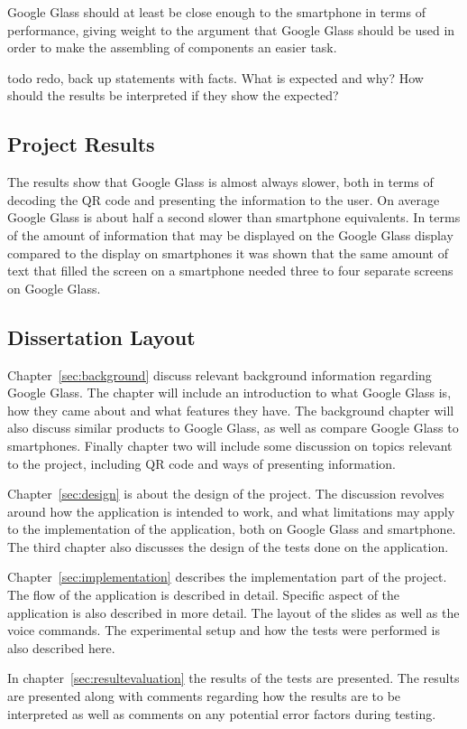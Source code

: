 Google Glass should at least be close enough to the smartphone in terms of performance, giving weight to the argument that Google Glass should be used in order to make the assembling of components an easier task.

todo redo, back up statements with facts. What is expected and why? How should the results be interpreted if they show the expected?

\subsection{Project Results}
The results show that Google Glass is almost always slower, both in terms of decoding the QR code and presenting the information to the user. On average Google Glass is about half a second slower than smartphone equivalents. In terms of the amount of information that may be displayed on the Google Glass display compared to the display on smartphones it was shown that the same amount of text that filled the screen on a smartphone needed three to four separate screens on Google Glass.

\subsection{Dissertation Layout}
Chapter~\ref{sec:background} discuss relevant background information regarding Google Glass. The chapter will include an introduction to what Google Glass is, how they came about and what features they have. The background chapter will also discuss similar products to Google Glass, as well as compare Google Glass to smartphones. Finally chapter two will include some discussion on topics relevant to the project, including QR code and ways of presenting information.

Chapter~\ref{sec:design} is about the design of the project. The discussion revolves around how the application is intended to work, and what limitations may apply to the implementation of the application, both on Google Glass and smartphone. The third chapter also discusses the design of the tests done on the application.

Chapter~\ref{sec:implementation} describes the implementation part of the project. The flow of the application is described in detail. Specific aspect of the application is also described in more detail. The layout of the slides as well as the voice commands. The experimental setup and how the tests were performed is also described here.

In chapter~\ref{sec:resultevaluation} the results of the tests are presented. The results are presented along with comments regarding how the results are to be interpreted as well as comments on any potential error factors during testing.

